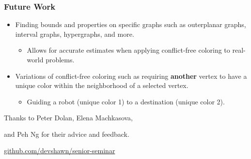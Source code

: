 \documentclass[xcolor=dvipsnames,aspectratio=1610]{beamer}
\begin{document}
  \begin{frame}
    \frametitle{Future Work}

    \begin{itemize}
      \item Finding bounds and properties on specific graphs such as outerplanar graphs, interval graphs, hypergraphs, and more.
      \pause
      \vfill
      \begin{itemize}
        \item Allows for accurate estimates when applying conflict-free coloring to real-world problems.
      \end{itemize}
      \pause
      \vfill
      \item Variations of conflict-free coloring such as requiring \textbf{another} vertex to have a unique color within the neighborhood of a selected vertex.
      \pause
      \vfill
      \begin{itemize}
        \item Guiding a robot (unique color 1) to a destination (unique color 2).
      \end{itemize}
    \end{itemize}

  \end{frame}

  \begin{frame}[standout]
    \centering
    {Thanks to Peter Dolan, Elena Machkasova,

    and Peh Ng for their advice and feedback.}
    \vfill
    \href{https://github.com/devshawn/senior-seminar}{github.com/devshawn/senior-seminar}
    \vfill
    \ccbyncsa{}
  \end{frame}
\end{document}
